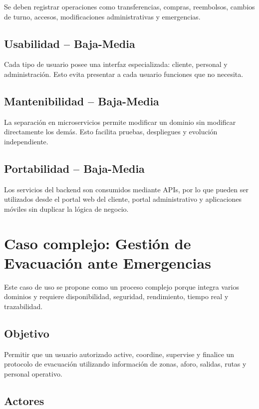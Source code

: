 \documentclass[12pt,a4paper]{article}
\begin{document}
Se deben registrar operaciones como transferencias, compras, reembolsos, cambios de turno, accesos, modificaciones administrativas y emergencias.

\subsection{Usabilidad -- Baja-Media}

Cada tipo de usuario posee una interfaz especializada: cliente, personal y administración. Esto evita presentar a cada usuario funciones que no necesita.

\subsection{Mantenibilidad -- Baja-Media}

La separación en microservicios permite modificar un dominio sin modificar directamente los demás. Esto facilita pruebas, despliegues y evolución independiente.

\subsection{Portabilidad -- Baja-Media}

Los servicios del backend son consumidos mediante APIs, por lo que pueden ser utilizados desde el portal web del cliente, portal administrativo y aplicaciones móviles sin duplicar la lógica de negocio.

\section{Caso complejo: Gestión de Evacuación ante Emergencias}

Este caso de uso se propone como un proceso complejo porque integra varios dominios y requiere disponibilidad, seguridad, rendimiento, tiempo real y trazabilidad.

\subsection{Objetivo}

Permitir que un usuario autorizado active, coordine, supervise y finalice un protocolo de evacuación utilizando información de zonas, aforo, salidas, rutas y personal operativo.

\subsection{Actores}
\end{document}
